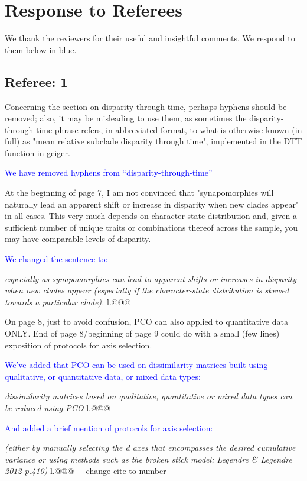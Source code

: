 \documentclass[12pt,letterpaper]{article}
\begin{document}
\section{Response to Referees}

We thank the reviewers for their useful and insightful comments. We respond to them below in blue.

\subsection{Referee: 1}
\noindent Concerning the section on disparity through time, perhaps hyphens should be removed; also, it may be misleading to use them, as sometimes the disparity-through-time phrase refers, in abbreviated format, to what is otherwise known (in full) as "mean relative subclade disparity through time", implemented in the DTT function in geiger.

\textcolor{blue}{We have removed hyphens from ``disparity-through-time''}

\noindent At the beginning of page 7, I am not convinced that "synapomorphies will naturally lead an apparent shift or increase in disparity when new clades appear" in all cases. This very much depends on character-state distribution and, given a sufficient number of unique traits or combinations thereof across the sample, you may have comparable levels of disparity.

\textcolor{blue}{We changed the sentence to:}

\textit{especially as synapomorphies can lead to apparent shifts or increases in disparity when new clades appear (especially if the character-state distribution is skewed towards a particular clade).} l.@@@

\noindent On page 8, just to avoid confusion, PCO can also applied to quantitative data ONLY. End of page 8/beginning of page 9 could do with a small (few lines) exposition of protocols for axis selection.

\textcolor{blue}{We've added that PCO can be used on dissimilarity matrices built using qualitative, or quantitative data, or mixed data types:}

\textit{dissimilarity matrices based on qualitative, quantitative or mixed data types can be reduced using PCO} l.@@@

\textcolor{blue}{And added a brief mention of protocols for axis selection:}

\textit{(either by manually selecting the d axes that encompasses the desired cumulative variance or using methods such as the broken stick model; Legendre \& Legendre 2012 p.410)} l.@@@ + change cite to number
\end{document}
